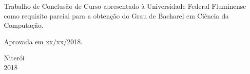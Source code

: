 \noindent
\begin{flushright}
\begin{minipage}[t]{8cm}

Trabalho de Conclusão de Curso apresentado à Universidade Federal Fluminense como requisito parcial para a obtenção do Grau
de Bacharel em Ciência da Computação.

\end{minipage}
\end{flushright}
\vspace{1.0 cm}
\noindent
Aprovada em xx/xx/2018. \\ 
\begin{flushright}
\end{flushright}
\begin{center}
  \vspace{6mm}
  Niterói \\
  \vspace{6mm}
  2018
\end{center}


